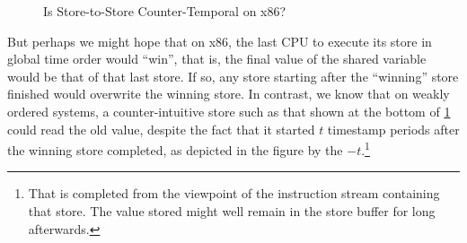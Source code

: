 {\begin{figure}
\centering
{}
\caption{Is Store-to-Store Counter-Temporal on x86?}
\label{fig:memorder:Is Store-to-Store Counter-Temporal on x86?}
\end{figure}

	But perhaps we might hope that on x86, the last CPU to execute its
	store in global time order would ``win'', that is, the final value
	of the shared variable would be that of that last store.
	If so, any store starting after the ``winning'' store finished would
	overwrite the winning store.
	In contrast, we know that on weakly ordered systems, a
	counter-intuitive store such as that shown at the bottom of
	\cref{fig:memorder:Is Store-to-Store Counter-Temporal on x86?}
	could read the old value, despite the fact that it started
	$t$ timestamp periods after the winning store completed,
	as depicted in the figure by the $-t$.\footnote{
		That is completed from the viewpoint of the instruction
		stream containing that store.
		The value stored might well remain in the store buffer
		for long afterwards.}

}
